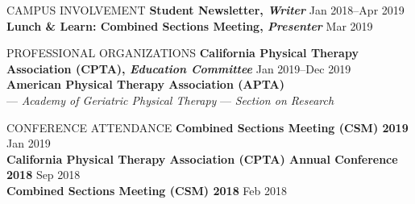 \documentclass{resume} %
\begin{document}
\begin{rSection}{CAMPUS INVOLVEMENT}
{\textbf{Student Newsletter, \textit{Writer}} \hfill{Jan 2018--Apr 2019}}
\\
{\textbf{Lunch \& Learn: Combined Sections Meeting, \textit{Presenter}} \hfill{Mar 2019}}
\end{rSection} 
\begin{rSection}{PROFESSIONAL ORGANIZATIONS}
{\textbf{California Physical Therapy Association (CPTA), \textit{Education Committee}} \hfill{Jan 2019--Dec 2019}}
\\
{\textbf{American Physical Therapy Association (APTA)}\\
\-\hspace{5mm} --- \textit{Academy of Geriatric Physical Therapy}
\-\hspace{5mm} --- \textit{Section on Research}}
\end{rSection} 
\begin{rSection}{CONFERENCE ATTENDANCE}
{\textbf{Combined Sections Meeting (CSM) 2019} \hfill{Jan 2019}}
\\
{\textbf{California Physical Therapy Association (CPTA) Annual Conference 2018} \hfill{Sep 2018}}\\
{\textbf{Combined Sections Meeting (CSM) 2018} \hfill{Feb 2018}}
\end{rSection}
\end{document}
